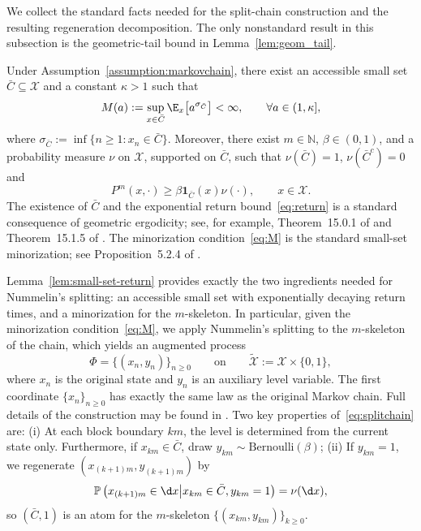 \documentclass[mnsc,nonblindrev]{informs3}
\begin{document}
We collect the standard facts needed for the split-chain construction and the
resulting regeneration decomposition. The only nonstandard result in this
subsection is the geometric-tail bound in Lemma~\ref{lem:geom_tail}.
\begin{lemma}\label{lem:small-set-return}
Under Assumption~\ref{assumption:markovchain}, there exist an accessible small set \(\bar C\subseteq \mathcal X\) and a constant \(\kappa>1\) such that
\begin{equation}\label{eq:return}
    M(a):=\sup_{x\in \bar C}\E_x\big[a^{\sigma_{\bar C}}\big]<\infty,
    \qquad \forall a\in(1,\kappa],
\end{equation}
where $\sigma_{\bar C}:=\inf\{n\ge 1:x_n\in \bar C\}.$ Moreover, there exist \(m\in\mathbb N\), \(\beta\in(0,1)\), and a probability measure \(\nu\) on \(\mathcal X\), supported on \(\bar C\), such that \(\nu(\bar C)=1\), \(\nu(\bar C^c)=0\) and 
\begin{equation}\label{eq:M}
   P^m(x,\cdot)\ge \beta \mathbf{1}_{\bar C}(x)\nu(\cdot),
   \qquad x\in\mathcal X.
\end{equation}
The existence of \(\bar C\) and the exponential return bound~\eqref{eq:return} is a standard consequence of geometric ergodicity; see, for example, Theorem~15.0.1 of \cite{Meyn12_book} and Theorem~15.1.5 of \cite{douc2018markov}. The minorization condition~\eqref{eq:M} is the standard small-set minorization; see Proposition~5.2.4 of \cite{Meyn12_book}.
\end{lemma}
Lemma~\ref{lem:small-set-return} provides exactly the two ingredients needed for
Nummelin's splitting: an accessible small set with exponentially decaying
return times, and a minorization for the \(m\)-skeleton. In particular, given the minorization condition~\eqref{eq:M}, we apply Nummelin's splitting \citep{nummelin1978splitting} to the \(m\)-skeleton of the chain, which yields an augmented process \begin{equation}\label{eq:splitchain} \Phi=\{(x_n,y_n)\}_{n\ge 0} \qquad\text{on}\qquad \widetilde{\mathcal X}:=\mathcal X\times\{0,1\}, \end{equation} where \(x_n\) is the original state and \(y_n\) is an auxiliary level variable. The first coordinate \(\{x_n\}_{n\ge 0}\) has exactly the same law as the original Markov chain. Full details of the construction may be found in \cite{Meyn12_book,lemanczyk2021general}. Two key properties of~\eqref{eq:splitchain} are: (i) At each block boundary $km$, the level is determined from the current state only. Furthermore, if $x_{km}\in\bar C$, draw $y_{km}\sim\mathrm{Bernoulli}(\beta)$; (ii) If $y_{km}=1$, we regenerate $(x_{(k+1)m},y_{(k+1)m})$ by \[ \mathbb P\left(x_{(k+1)m}\in \d x \middle| x_{km}\in\bar C, y_{km}=1\right)=\nu(\d x), \] so $(\bar C,1)$ is an atom for the $m$-skeleton $\{(x_{km}, y_{km})\}_{k \geq 0}$.
\end{document}
